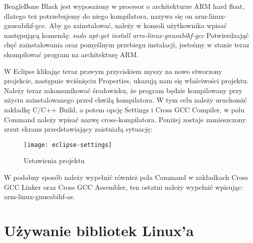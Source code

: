 BeagleBone Black jest wyposażony w procesor o architekturze ARM hard float, dlatego też potrzebujemy do niego kompilatora, nazywa się on arm-linux-gnueabihf-gcc. Aby go zainstalować, należy w konsoli użytkownika wpisać następującą komendę:\newline
\emph{sudo apt-get install arm-linux-gnueabihf-gcc}\newline
Potwierdzająć chęć zainstalowania oraz pomyślnym przebiegu instalacji, jesteśmy w stanie teraz skompilować program na architekturę ARM.

W Eclipse klikając teraz prawym przyciskiem myszy na nowo stworzony projekcie, następnie wciśnięciu Properties, ukazują nam się właściwości projektu. Należy teraz zakomunikować środowisku, że program będzie kompilowany przy użyciu zainstalowanego przed chwilą kompilatora. W tym celu należy uruchomić zakładkę C/C++ Build, a potem opcję Settings i Cross GCC Compiler, w polu Command należy wpisać nazwę cross-kompilatora. Poniżej zostaje zamieszczony zrzut ekranu przedstawiający zaistniałą sytuację:

\begin{figure}[h]
\centering
\texttt{[image: eclipse-settings]}
\caption{Ustawienia projektu}
\label{fig:eclipse-settings}
\end{figure}

W podobny sposób należy wypełnić również pola Command w zakładkach Cross GCC Linker oraz Cross GCC Assembler, ten ostatni należy wypełnić wpisując: arm-linux-gnueabihf-as.

\section{Używanie bibliotek Linux'a}
